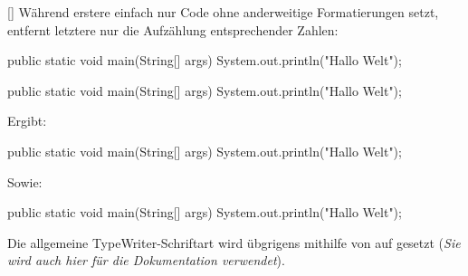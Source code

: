 [\cmdlist {}]
Während erstere einfach nur Code ohne anderweitige Formatierungen setzt, entfernt letztere nur die Aufzählung entsprechender Zahlen:
\begin{latex}
\begin{lstplain}[language=lJava]
public static void main(String[] args) {
    System.out.println("Hallo Welt");
}
\end{lstplain}
\begin{lstnonum}[language=lJava]
public static void main(String[] args) {
    System.out.println("Hallo Welt");
}
\end{lstnonum}
\end{latex}
Ergibt:
\begin{lstplain}[language=lJava]
public static void main(String[] args) {
    System.out.println("Hallo Welt");
}
\end{lstplain}
Sowie:
\begin{lstnonum}[language=lJava]
public static void main(String[] args) {
    System.out.println("Hallo Welt");
}
\end{lstnonum}

Die allgemeine TypeWriter-Schriftart wird übgrigens mithilfe von  auf  gesetzt (\textit{Sie wird auch hier für die Dokumentation verwendet}).


